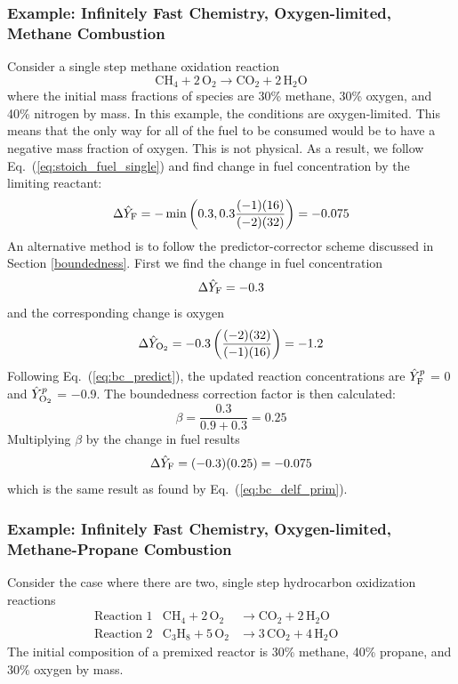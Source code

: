 \subsubsection{Example: Infinitely Fast Chemistry, Oxygen-limited, Methane Combustion}
Consider a single step methane oxidation reaction
\begin{equation}\label{eq:bc_methane}
\mathrm{CH_4 + 2 \, O_2} \rightarrow  \mathrm{CO_2 + 2 \, H_2O}
\end{equation}
where the initial mass fractions of species are 30\% methane, 30\% oxygen, and 40\% nitrogen by mass. In this example, the conditions are oxygen-limited. This means that the only way for all of the fuel to be consumed would be to have a negative mass fraction of oxygen. This is not physical. As a result, we follow Eq.~(\ref{eq:stoich_fuel_single}) and find change in fuel concentration by the limiting reactant:
\begin{equation}\label{eq:bc_delf_prim}
\Delta \hat{Y}_{\rm F} = -\min \left( 0.3, 0.3 \frac{(-1)(16)}{(-2)(32)}\right) = -0.075
\end{equation}
An alternative method is to follow the predictor-corrector scheme discussed in Section \ref{boundedness}. First we find the change in fuel concentration
\begin{equation}\label{eq:bc_fuel_single}
\Delta \hat{Y}_{\rm F} = -0.3
\end{equation}
and the corresponding change is oxygen
\begin{equation}\label{eq:bc_o2_single}
\Delta \hat{Y}_{\rm O_2} = -0.3 \left( \frac{(-2)(32)}{(-1)(16)} \right) = -1.2
\end{equation}
Following Eq.~(\ref{eq:bc_predict}), the updated reaction concentrations are $\hat{Y}_{\rm F}^p$ = 0 and $\hat{Y}_{\rm O_2}^p$ = $-$0.9. The boundedness correction factor is then calculated:
\begin{equation}\label{eq:calc_beta_single}
\beta = \frac{0.3}{0.9 + 0.3} = 0.25
\end{equation}
Multiplying $\beta$ by the change in fuel results
\begin{equation}\label{eq:bc_beta_single}
\Delta \hat{Y}_{\rm F} = (-0.3)(0.25) = -0.075
\end{equation}
which is the same result as found by Eq.~(\ref{eq:bc_delf_prim}).

\subsubsection{Example: Infinitely Fast Chemistry, Oxygen-limited, Methane-Propane Combustion}
Consider the case where there are two, single step hydrocarbon oxidization reactions
\begin{align}
&\mbox{Reaction 1}& \mathrm{CH_4 + 2 \, O_2} &\rightarrow  \mathrm{CO_2 + 2 \, H_2O}       && && \label{eq:two_fuel_ox_limit1} \\
&\mbox{Reaction 2}& \mathrm{C_3H_8 + 5 \, O_2} &\rightarrow \mathrm{3 \,CO_2 + 4 \, H_2O}  && && \label{eq:two_fuel_ox_limit2}
\end{align}
The initial composition of a premixed reactor is 30\% methane, 40\% propane, and 30\% oxygen by mass. 
